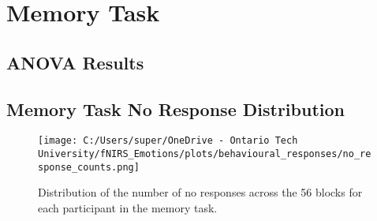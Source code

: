 \label{tab:appendix_fc_emotion_analysis}



\chapter{Memory Task}
\section{ANOVA Results}
\label{tab:appendix_memory_task_anova}


\section{Memory Task No Response Distribution}
\begin{figure}[H]
    \centering
    \texttt{[image: C:/Users/super/OneDrive - Ontario Tech University/fNIRS\_Emotions/plots/behavioural\_responses/no\_response\_counts.png]}
    \caption[Memory Task No Response Distribution]{Distribution of the number of no responses across the 56 blocks for each participant in the memory task.}
    \label{fig:appendix_memory_task_no_response_distribution}
\end{figure}